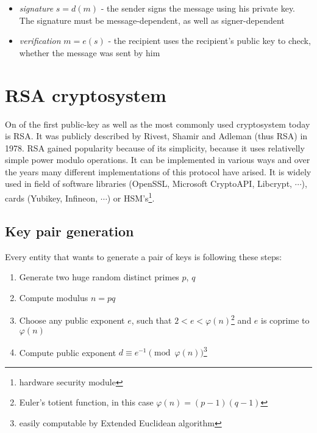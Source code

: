 \begin{itemize}

\item \textit{signature} $s = d(m)$ - the sender signs the message using his private key. The signature must be message-dependent, as well as signer-dependent

\item \textit{verification} $m = e(s)$ - the recipient uses the recipient's public key to check, whether the message was sent by him

\end{itemize}

\section{RSA cryptosystem}

On of the first public-key as well as the most commonly used cryptosystem today is RSA. It was publicly described by Rivest, Shamir and Adleman (thus RSA) in 1978\cite{RSA_paper}. RSA gained popularity because of its simplicity, because it uses relativelly simple power modulo operations. It can be implemented in various ways and over the years many different implementations of this protocol have arised. It is widely used in field of software libraries (OpenSSL, Microsoft CryptoAPI, Libcrypt, $\cdots$), cards (Yubikey, Infineon, $\cdots$) or HSM's\footnote{hardware security module}.


\subsection*{Key pair generation}

Every entity that wants to generate a pair of keys is following these steps:

\begin{enumerate}

\item Generate two huge random distinct primes $p$, $q$
\item Compute modulus $n = pq$
\item Choose any public exponent $e$, such that $2 < e < \varphi(n)$\footnote{Euler's totient function, in this case $\varphi(n) = (p-1)(q-1)$} and $e$ is coprime to $\varphi(n)$
\item Compute public exponent $d \equiv e^{-1} \pmod{\varphi(n)}$\footnote{easily computable by Extended Euclidean algorithm}

\end{enumerate}

